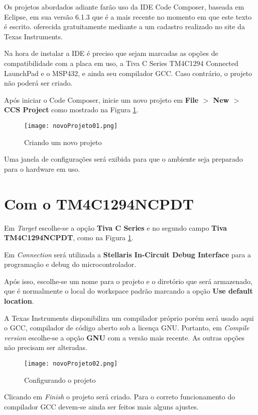 Os projetos abordados adiante farão uso da IDE Code Composer, baseada em Eclipse, em sua versão 6.1.3 que é a mais recente no momento em que este texto é escrito. oferecida gratuitamente mediante a um cadastro realizado no site da Texas Instruments.

Na hora de instalar a IDE é preciso que sejam marcadas as opções de compatibilidade com a placa em uso, a Tiva C Series TM4C1294 Connected LaunchPad e o MSP432, e ainda seu compilador GCC. Caso contrário, o projeto não poderá ser criado.

Após iniciar o Code Composer, inicie um novo projeto em \textbf{File $>$ New $>$ CCS Project} como mostrado na Figura \ref{fig:novoProjeto01}.

\begin{figure}[H]
	\centering
	\texttt{[image: novoProjeto01.png]}
	\caption{Criando um novo projeto}
	\label{fig:novoProjeto01}
\end{figure}

Uma janela de configurações será exibida para que o ambiente seja preparado 
para o hardware em uso.

\section{Com o TM4C1294NCPDT}

Em \emph{Target} escolhe-se a opção 
\textbf{Tiva C Series} e no segundo campo \textbf{Tiva TM4C1294NCPDT}, como na Figura \ref{fig:novoProjeto01}.

Em \emph{Connection} será utilizada a \textbf{Stellaris In-Circuit 
Debug Interface} para a programação e debug do microcontrolador.

Após isso, escolhe-se um nome para o projeto e o diretório que será armazenado, 
que é normalmente o local do workspace padrão marcando a opção \textbf{Use 
default location}.

A Texas Instruments disponibiliza um compilador próprio porém será usado aqui o 
GCC, compilador de código aberto sob a licença GNU. Portanto, em \emph{Compile 
version} escolhe-se a opção \textbf{GNU} com a versão mais recente.
As outras opções não precisam ser alteradas.

\begin{figure}[H]
	\centering
	\texttt{[image: novoProjeto02.png]}
	\caption{Configurando o projeto}
	\label{fig:novoProjeto02}
\end{figure}

Clicando em \emph{Finish} o projeto será criado. Para o correto funcionamento 
do compilador GCC devem-se ainda ser feitos mais alguns ajustes.

